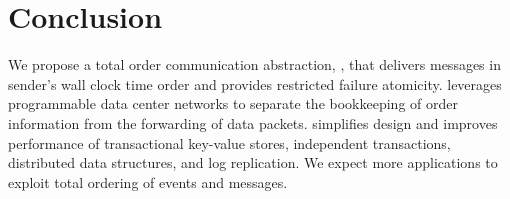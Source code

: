 \section{Conclusion}
\label{sec:conclusion}

We propose a total order communication abstraction, \sys{}, that delivers messages in sender's wall clock time order and provides restricted failure atomicity. 
\sys{} leverages programmable data center networks to separate the bookkeeping of order information from the forwarding of data packets.
\sys{} simplifies design and improves performance of transactional key-value stores, independent transactions, distributed data structures, and log replication.
We expect more applications to exploit total ordering of events and messages.
